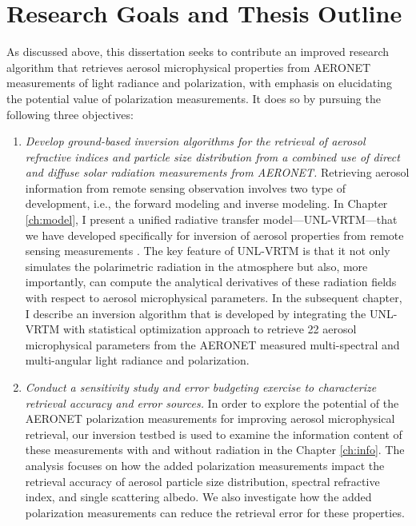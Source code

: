 \section{Research Goals and Thesis Outline} \label{sec:objective}

As discussed above, this dissertation seeks to contribute an improved
research algorithm that retrieves aerosol microphysical properties from AERONET
measurements of light radiance and polarization, with emphasis on elucidating
the potential value of polarization measurements. It does so by 
pursuing the following three objectives:

\begin{enumerate}
\item \textit{Develop ground-based inversion algorithms for the
retrieval of aerosol refractive indices and particle size distribution from a 
combined use of direct and diffuse solar radiation measurements from AERONET.}
\newline
Retrieving aerosol information from remote sensing observation
involves two type of development, i.e., the forward modeling and inverse
modeling. In Chapter \ref{ch:model}, I present a unified radiative transfer 
model---UNL-VRTM---that we have developed specifically for inversion of
aerosol properties from remote sensing measurements \citep{Wang14}. The
key feature of UNL-VRTM is that it not only simulates the
polarimetric radiation in the atmosphere but also, more importantly,
can compute the analytical derivatives of these radiation fields with respect
to aerosol microphysical parameters. In the subsequent chapter, I
describe an inversion algorithm that is developed by integrating the UNL-VRTM 
with statistical optimization approach to retrieve 22 aerosol
microphysical parameters from the AERONET measured multi-spectral and
multi-angular light radiance and polarization. 

\item \textit{Conduct a sensitivity study and error budgeting exercise to
characterize retrieval accuracy and error sources.} 
\newline 
In order to explore the potential of the AERONET polarization measurements
for improving aerosol microphysical retrieval, our inversion testbed is
used to examine the information content of these measurements with and without
radiation in the Chapter \ref{ch:info}. The analysis focuses on
how the added polarization measurements impact the retrieval accuracy
of aerosol particle size distribution, spectral refractive
index, and single scattering albedo. We also investigate how the 
added polarization measurements can reduce the retrieval error for these
properties.  


\end{enumerate}
